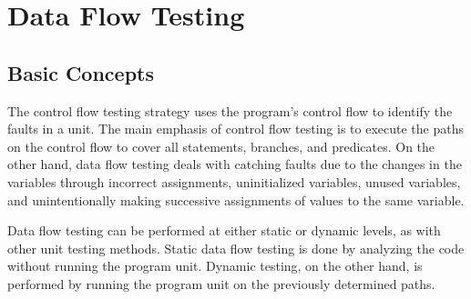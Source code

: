 \setchapterpreamble[u]{\margintoc}
\chapter{Data Flow Testing}
\section{Basic Concepts}
The control flow testing strategy uses the program's control flow to identify the faults in a unit. The main emphasis of control flow testing is to execute the paths on the control flow to cover all statements, branches, and predicates. On the other hand, data flow testing deals with catching faults due to the changes in the variables through incorrect assignments, uninitialized variables, unused variables, and unintentionally making successive assignments of values to the same variable. 

Data flow testing can be performed at either static or dynamic levels, as with other unit testing methods. Static data flow testing is done by analyzing the code without running the program unit. Dynamic testing, on the other hand, is performed by running the program unit on the previously determined paths.

